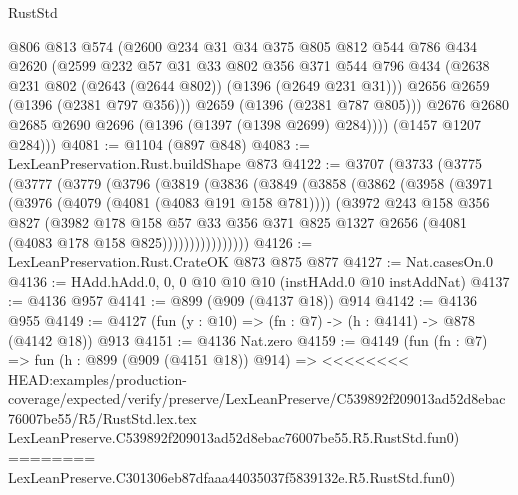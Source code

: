 \begin{lexlean}{RustStd}
\begin{coremodule}
{\begin{coremodule}
{{{{{{{{{            @806
            @813
            @574
            (@2600
              @234
              @31
              @34
              @375
              @805
              @812
              @544
              @786
              @434
              @2620
              (@2599
                @232
                @57
                @31
                @33
                @802
                @356
                @371
                @544
                @796
                @434
                (@2638 @231 @802 (@2643 (@2644 @802)) (@1396 (@2649 @231 @31)))
                @2656
                @2659
                (@1396 (@2381 @797 @356)))
              @2659
              (@1396 (@2381 @787 @805)))
            @2676
            @2680
            @2685
            @2690
            @2696
            (@1396 (@1397 (@1398 @2699) @284))))
        (@1457 @1207 @284)))
@4081 := @1104 (@897 @848)
@4083 := LexLeanPreservation.Rust.buildShape @873
@4122 := @3707
    (@3733
      (@3775
        (@3777
          (@3779
            (@3796
              (@3819
                (@3836
                  (@3849
                    (@3858
                      (@3862
                        (@3958
                          (@3971
                            (@3976 (@4079 (@4081 (@4083 @191 @158 @781))))
                            (@3972
                              @243
                              @158
                              @356
                              @827
                              (@3982
                                @178
                                @158
                                @57
                                @33
                                @356
                                @371
                                @825
                                @1327
                                @2656
                                (@4081 (@4083 @178 @158 @825))))))))))))))))
@4126 := LexLeanPreservation.Rust.CrateOK @873 @875 @877
@4127 := Nat.casesOn.{0}
@4136 := HAdd.hAdd.{0, 0, 0} @10 @10 @10 (instHAdd.{0} @10 instAddNat)
@4137 := @4136 @957
@4141 := @899 (@909 (@4137 @18)) @914
@4142 := @4136 @955
@4149 := @4127 (fun (y : @10) => (fn : @7) -> (h : @4141) -> @878 (@4142 @18)) @913
@4151 := @4136 Nat.zero
@4159 := @4149
    (fun (fn : @7) =>
    fun (h : @899 (@909 (@4151 @18)) @914) =>
<<<<<<<< HEAD:examples/production-coverage/expected/verify/preserve/LexLeanPreserve/C539892f209013ad52d8ebac76007be55/R5/RustStd.lex.tex
    LexLeanPreserve.C539892f209013ad52d8ebac76007be55.R5.RustStd.fun0)
========
    LexLeanPreserve.C301306eb87dfaaa44035037f5839132e.R5.RustStd.fun0)
}}}}}}}}}
\end{coremodule}}
\end{coremodule}
\end{lexlean}
